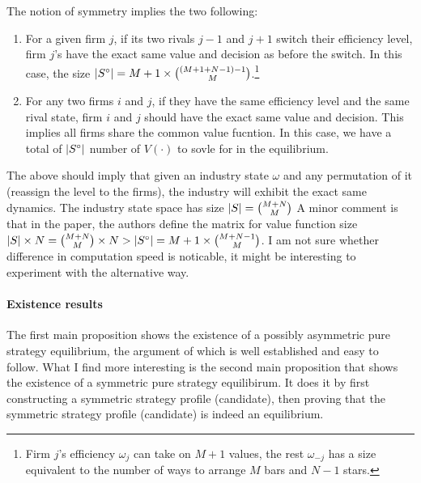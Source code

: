 \documentclass[12pt]{article}[margin=1in]
\begin{document}
The notion of symmetry implies the two following: 
\begin{enumerate}
    \item For a given firm $j$, if its two rivals $j-1$ and $j+1$ switch their efficiency level, firm $j$'s have the exact same value and decision as before the switch. In this case, the size $\left| S^\circ\right| = M+1 \times \binom{(M+1+N-1)-1}{M}$.\footnote{Firm $j$'s efficiency $\omega_j$ can take on $M+1$ values, the rest $\omega_{-j}$ has a size equivalent to the number of ways to arrange $M$ bars and $N-1$ stars.}
    \item For any two firms $i$ and $j$, if they have the same efficiency level and the same rival state, firm $i$ and $j$ should have the exact same value and decision. This implies all firms share the common value fucntion. In this case, we have a total of $\left| S^\circ\right|$ number of $V(\cdot)$ to sovle for in the equilibrium.
\end{enumerate}
The above should imply that given an industry state $\omega$ and any permutation of it (reassign the level to the firms), the industry will exhibit the exact same dynamics. The industry state space has size $\left| S\right|=\binom{M+N}{M}$
A minor comment is that in the paper, the authors define the matrix for value function  size $\left| S\right| \times N = \binom{M+N}{M} \times N > \left| S^\circ\right| = M+1 \times \binom{M+N-1}{M}$. I am not sure whether difference in computation speed is noticable, it might be interesting to experiment with the alternative way.

\paragraph{Existence results} The first main proposition shows the existence of a possibly asymmetric pure strategy equilibrium, the argument of which is well established and easy to follow. What I find more interesting is the second main proposition that shows the existence of a symmetric pure strategy equilibirum. It does it by first constructing a symmetric strategy profile (candidate), then proving that the  symmetric strategy profile (candidate) is indeed an equilibrium. 
\end{document}
